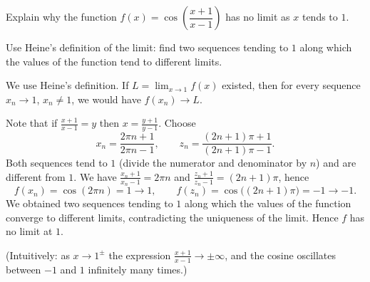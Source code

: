 
\begin{question}
Explain why the function $f(x)=\cos\left(\dfrac{x+1}{x-1}\right)$ has no limit as $x$ tends to $1$.
\end{question}

\begin{hint}
Use Heine's definition of the limit: find two sequences tending to $1$ along which the values of the function tend to different limits.
\end{hint}

\begin{solution}
We use Heine's definition. If $L=\lim_{x\to1}f(x)$ existed, then for every sequence $x_n\to1$, $x_n\ne1$, we would have $f(x_n)\to L$.

Note that if $\frac{x+1}{x-1}=y$ then $x=\frac{y+1}{y-1}$. Choose
\[ x_n=\frac{2\pi n+1}{2\pi n-1},\qquad z_n=\frac{(2n+1)\pi+1}{(2n+1)\pi-1}. \]
Both sequences tend to $1$ (divide the numerator and denominator by $n$) and are different from $1$. We have $\frac{x_n+1}{x_n-1}=2\pi n$ and $\frac{z_n+1}{z_n-1}=(2n+1)\pi$, hence
\[ f(x_n)=\cos(2\pi n)=1\to1,\qquad f(z_n)=\cos\big((2n+1)\pi\big)=-1\to-1. \]
We obtained two sequences tending to $1$ along which the values of the function converge to different limits, contradicting the uniqueness of the limit. Hence $f$ has no limit at $1$.

(Intuitively: as $x\to1^\pm$ the expression $\frac{x+1}{x-1}\to\pm\infty$, and the cosine oscillates between $-1$ and $1$ infinitely many times.)
\end{solution}
